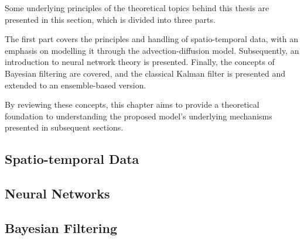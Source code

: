 Some underlying principles of the theoretical topics behind this thesis are presented in this section, which is divided into three parts.

The first part covers the principles and handling of spatio-temporal data, with an emphasis on modelling it through the advection-diffusion model.
Subsequently, an introduction to neural network theory is presented.
Finally, the concepts of Bayesian filtering are covered, and the classical Kalman filter is presented and extended to an ensemble-based version. 

By reviewing these concepts, this chapter aims to provide a theoretical foundation to understanding the proposed model's underlying mechanisms presented in subsequent sections. 
\subsection{Spatio-temporal Data}

\subsection{Neural Networks}

\subsection{Bayesian Filtering}

